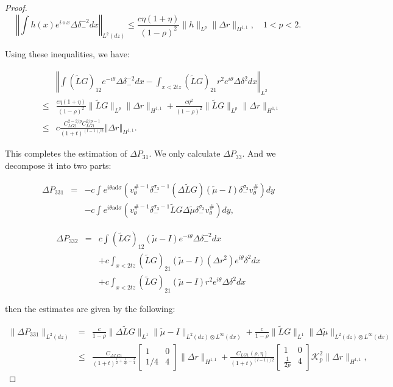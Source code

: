 \documentclass{amsart}
\theoremstyle{plain}
\theoremstyle{remark}
\numberwithin{equation}{section}
\newcommand{\Twomat}[4]
{
\left[
	\begin{array}{cc}
		{#1}	&	{#2}	\\[10pt]
		{#3}	&	{#4}
		\end{array}
\right]
}
\begin{document}
\begin{proof}
    \begin{equation}
    \left\Vert \int h(x) e^{i \diamond x}\Delta \delta_-^{-2}dx \right\Vert_{L^2(dz)} \leq \frac{c\eta(1+\eta)}{(1-\rho)^2}\|h\|_{L^p}\|\Delta r\|_{H^{1,1}},\quad  1<p<2.
    \end{equation}

    Using these inequalities, we have:

    \begin{eqnarray*}
    &&\left\Vert\int (\tilde{L}G)_{12}e^{-i\theta}\Delta \delta_-^{-2}dx-\int_{x<2tz} (\tilde{L}G)_{21}r^2e^{i\theta} \Delta \delta^2dx\right\Vert_{L^2}\\
    &\leq& \frac{c\eta(1+\eta)}{(1-\rho)^2}\|\tilde{L}G\|_{L^p}\|\Delta r\|_{H^{1,1}} + \frac{c\eta ^2}{(1-\rho)^2}\|\tilde{L}G\|_{L^p}\|\Delta r\|_{H^{1,1}}\\
    \nonumber
    &\leq& c\frac{C_{ LG2}^{2-2/p} C_{ LG1}^{2/p-1}}{(1+t)^{(l-1)/2}} \left\Vert \Delta r\right\Vert _{H^{1,1}}.
    \end{eqnarray*}

 This completes the estimation of $\Delta P_{31}$.   We only calculate  $\Delta P_{33}$. And we decompose it into two parts:

    \begin{eqnarray*}
    \Delta P_{331} &=& -c \int e^{i \theta \mathrm{ad} \sigma}\left(v_\theta^{\#-1}\delta_-^{\sigma_3-1}(\Delta \tilde{L}G)(\tilde{\mu}-I)\delta_-^{\sigma_3}v_\theta^{\#}\right) dy \\
    &&-c \int e^{i \theta \mathrm{ad} \sigma}\left(v_\theta^{\#-1}\delta_-^{\sigma_3-1}\tilde{L}G\Delta \tilde{\mu}\delta_-^{\sigma_3}v_\theta^{\#}\right) dy,
    \end{eqnarray*}

    \begin{eqnarray*}
    \Delta P_{332} &=& c\int (\tilde{L}G)_{12}(\tilde{\mu}-I)e^{-i\theta} \Delta \delta_-^{-2}dx\\
    &&+c\int_{x<2tz}(\tilde{L}G)_{21}(\tilde{\mu}-I) (\Delta r^2) e^{i\theta}\delta^2dx\\
    &&+c\int_{x<2tz}(\tilde{L}G)_{21}(\tilde{\mu}-I) r^2e^{i\theta} \Delta \delta^2dx
    \end{eqnarray*}

   then the estimates are given by the following:

    \begin{eqnarray*}
    \|\Delta P_{331}\|_{L^{2}(dz)} &=& \frac{c}{1-\rho}\|\Delta \tilde{L}G\|_{L^1}\|\tilde{\mu}-I\|_{L^2(dz) \otimes L^\infty(dx)}+\frac{c}{1-\rho}\|\tilde{L}G\|_{L^1}\|\Delta \tilde{\mu}\|_{L^2(dz) \otimes L^\infty(dx)}\\
    &\leq& \frac{C_{\Delta LG1}}{(1+t)^{\frac{l}{2}+\frac{1}{2p}-\frac{3}{4}}}\Twomat{1}{0}{1/4}{4}\|\Delta r\|_{H^{1,1}}+\frac{C_{LG1}(\rho, \eta)}{(1+t)^{(l-1)/2}}\Twomat{1}{0}{\frac{1}{2p}}{4}\mathcal{K}_{p}^2\|\Delta r\|_{H^{1,1}},
    \end{eqnarray*}


\end{proof}
\end{document}
